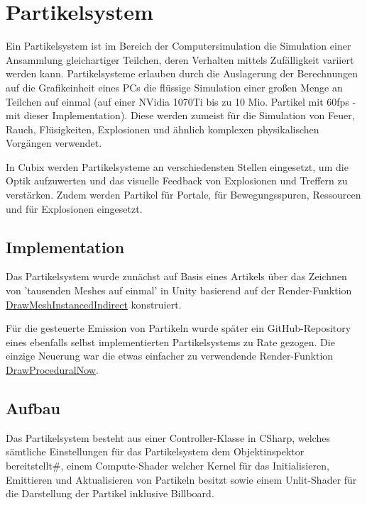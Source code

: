 \section{Partikelsystem}

Ein Partikelsystem ist im Bereich der Computersimulation die Simulation einer Ansammlung gleichartiger Teilchen, deren Verhalten mittels Zufälligkeit variiert werden kann. Partikelsysteme erlauben durch die Auslagerung der Berechnungen auf die Grafikeinheit eines PCs die flüssige Simulation einer großen Menge an Teilchen auf einmal (auf einer NVidia 1070Ti bis zu 10 Mio. Partikel mit 60fps - mit dieser Implementation). Diese werden zumeist für die Simulation von Feuer, Rauch, Flüsigkeiten, Explosionen und ähnlich komplexen physikalischen Vorgängen verwendet.

In Cubix werden Partikelsysteme an verschiedensten Stellen eingesetzt, um die Optik aufzuwerten und das visuelle Feedback von Explosionen und Treffern zu verstärken. Zudem werden Partikel für Portale, für Bewegungsspuren, Ressourcen und für Explosionen eingesetzt.



\subsection{Implementation}

Das Partikelsystem wurde zunächst auf Basis eines Artikels über das Zeichnen von 'tausenden Meshes auf einmal'\cite{qPartS1} in Unity basierend auf der Render-Funktion \href{https://docs.unity3d.com/ScriptReference/Graphics.DrawMeshInstancedIndirect.html}{DrawMeshInstancedIndirect} konstruiert.

Für die gesteuerte Emission von Partikeln wurde später ein GitHub-Repository eines ebenfalls selbst implementierten Partikelsystems\cite{qPartS2} zu Rate gezogen. Die einzige Neuerung war die etwas einfacher zu verwendende Render-Funktion \href{https://docs.unity3d.com/ScriptReference/Graphics.DrawProceduralNow.html}{DrawProceduralNow}.



\subsection{Aufbau}

Das Partikelsystem besteht aus einer Controller-Klasse in CSharp, welches sämtliche Einstellungen für das Partikelsystem dem Objektinspektor bereitstellt\#, einem Compute-Shader welcher Kernel für das Initialisieren, Emittieren und Aktualisieren von Partikeln besitzt sowie einem Unlit-Shader für die Darstellung der Partikel inklusive Billboard.


